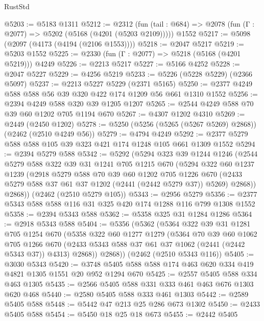 \begin{lexlean}{RustStd}
\begin{coremodule}
@5203 := @5183 @1311
@5212 := @2312
    (fun (tail : @684) => @2078 (fun (Γ : @2077) => @5202 (@5168 (@4201 (@5203 @2109)))))
    @1552
@5217 := @5098 (@2097 (@4173 (@4194 (@2106 @1553))))
@5218 := @2047 @5217
@5219 := @5203 @1552
@5225 := @2330 (fun (Γ : @2077) => @5218 (@5168 (@4201 @5219))) @4249
@5226 := @2213 @5217
@5227 := @5166 @4252
@5228 := @2047 @5227
@5229 := @4256 @5219
@5233 := @5226 (@5228 @5229) (@2366 @5097)
@5237 := @2213 @5227 @5229 (@2371 @5165)
@5250 := @2377 @4249 @588 @588 @56 @39 @320 @422 @174 @1209 @56 @661 @1310 @1552
@5256 := @2394 @4249 @588 @320 @39 @1205 @1207
@5265 := @2544 @4249 @588 @70 @39 @60 @1202 @705 @1194 @670
@5267 := @4307 @1202 @4310
@5269 := @2449 (@2450 @1202)
@5278 := @5250 (@5256 (@5265 (@5267 @5269) @2868)) (@2462 (@2510 @4249 @56))
@5279 := @4794 @4249
@5292 := @2377 @5279 @588 @588 @105 @39 @323 @421 @174 @1248 @105 @661 @1309 @1552
@5294 := @2394 @5279 @588
@5342 := @5292
    (@5294
      @323
      @39
      @1244
      @1246
      (@2544
        @5279
        @588
        @322
        @39
        @31
        @1241
        @705
        @1215
        @670
        (@5294
          @322
          @60
          @1237
          @1239
          (@2918
            @5279
            @588
            @70
            @39
            @60
            @1202
            @705
            @1226
            @670
            (@2433 @5279 @588 @37 @61 @37 @1202 (@2441 (@2442 @5279 @37)) @5269)
            @2868))
        @2868))
    (@2462 (@2510 @5279 @105))
@5343 := @2956 @5279
@5356 := @2377 @5343 @588 @588 @116 @31 @325 @420 @174 @1288 @116 @799 @1308 @1552
@5358 := @2394 @5343 @588
@5362 := @5358 @325 @31 @1284 @1286
@5364 := @2918 @5343 @588
@5404 := @5356
    (@5362
      (@5364
        @322
        @39
        @31
        @1281
        @705
        @1254
        @670
        (@5358
          @322
          @60
          @1277
          @1279
          (@5364
            @70
            @39
            @60
            @1062
            @705
            @1266
            @670
            (@2433 @5343 @588 @37 @61 @37 @1062 (@2441 (@2442 @5343 @37)) @4313)
            @2868))
        @2868))
    (@2462 (@2510 @5343 @116))
@5405 := @3030 @5343
@5420 := @3748 @5405 @588 @588 @174 @463 @620 @334 @419 @4821 @1305 @1551 @20 @952 @1294 @670
@5425 := @2557 @5405 @588 @334 @463 @1305
@5435 := @2566 @5405 @588 @331 @333 @461 @463 @676 @1303 @620 @468
@5440 := @2580 @5405 @588 @333 @461 @1303
@5442 := @2589 @5405 @588
@5448 := @5442 @47 @213 @25 @286 @673 @1302
@5450 := @2433 @5405 @588
@5454 := @5450 @18 @25 @18 @673
@5455 := @2442 @5405

\end{coremodule}
\end{lexlean}
